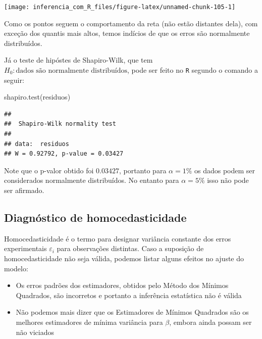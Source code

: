 \documentclass[
]{book}
\newenvironment{Shaded}{\begin{snugshade}}{\end{snugshade}}
\newcommand{\FunctionTok}[1]{\textcolor[rgb]{0.00,0.00,0.00}{#1}}
\newcommand{\NormalTok}[1]{#1}
\providecommand{\tightlist}{%
  \setlength{\itemsep}{0pt}\setlength{\parskip}{0pt}}
\begin{document}
\begin{center}\texttt{[image: inferencia\_com\_R\_files/figure-latex/unnamed-chunk-105-1]} \end{center}

Como os pontos seguem o comportamento da reta (não estão distantes dela), com exceção dos quantis mais altos, temos indícios de que os erros são normalmente distribuídos.

Já o teste de hipóstes de Shapiro-Wilk, que tem \(H_0: \text{dados são normalmente distribuídos}\), pode ser feito no \texttt{R} segundo o comando a seguir:

\begin{Shaded}
\begin{Highlighting}[]
\FunctionTok{shapiro.test}\NormalTok{(residuos)}
\end{Highlighting}
\end{Shaded}

\begin{verbatim}
## 
##  Shapiro-Wilk normality test
## 
## data:  residuos
## W = 0.92792, p-value = 0.03427
\end{verbatim}

Note que o p-valor obtido foi \(0.03427\), portanto para \(\alpha = 1\%\) os dados podem ser considerados normalmente distribuídos. No entanto para \(\alpha = 5\%\) isso não pode ser afirmado.

\hypertarget{diagnuxf3stico-de-homocedasticidade}{%
\subsection{Diagnóstico de homocedasticidade}\label{diagnuxf3stico-de-homocedasticidade}}

Homocedasticidade é o termo para designar variância constante dos erros experimentais \(\varepsilon_i\) para observações distintas. Caso a suposição de homocedasticidade não seja válida, podemos listar alguns efeitos no ajuste do modelo:

\begin{itemize}
\tightlist
\item
  Os erros padrões dos estimadores, obtidos pelo Método dos Mínimos Quadrados, são incorretos e portanto a inferência estatística não é válida
\item
  Não podemos mais dizer que os Estimadores de Mínimos Quadrados são os melhores estimadores de mínima variância para \(\beta\), embora ainda possam ser não viciados
\end{itemize}
\end{document}
